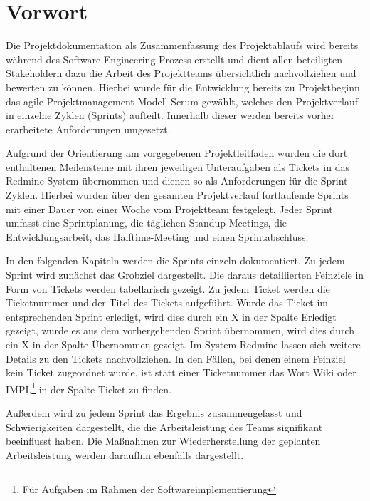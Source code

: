 \documentclass[a4paper,11pt,listof=numbered,glossary=totoc,parskip=half,toc=bib]{scrreprt}
\begin{document}
	
	\newpage
	\setcounter{tocdepth}{2}
	\tableofcontents	
	\renewcommand \thechapter{\Roman{chapter}}
	\listoftables
	\printglossaries

	


	
	\chapter{Vorwort}
	Die Projektdokumentation als Zusammenfassung des Projektablaufs wird bereits während des Software Engineering Prozess erstellt und dient allen beteiligten Stakeholdern dazu die Arbeit des Projektteams übersichtlich nachvollziehen und bewerten zu können. Hierbei wurde für die Entwicklung bereits zu Projektbeginn das agile Projektmanagement Modell Scrum gewählt, welches den Projektverlauf in einzelne Zyklen (Sprints) aufteilt. Innerhalb dieser werden bereits vorher erarbeitete Anforderungen umgesetzt. 
	
	Aufgrund der Orientierung am vorgegebenen Projektleitfaden wurden die dort enthaltenen Meilensteine mit ihren jeweiligen Unteraufgaben als Tickets in das Redmine-System übernommen und dienen so als Anforderungen für die Sprint-Zyklen. Hierbei wurden über den gesamten Projektverlauf fortlaufende Sprints mit einer Dauer von einer Woche vom Projektteam festgelegt. Jeder Sprint umfasst eine Sprintplanung, die täglichen Standup-Meetings, die Entwicklungsarbeit, das Halftime-Meeting und einen Sprintabschluss.

In den folgenden Kapiteln werden die Sprints einzeln dokumentiert. Zu jedem Sprint wird zunächst das Grobziel dargestellt. Die daraus detaillierten Feinziele in Form von Tickets werden tabellarisch gezeigt. Zu jedem Ticket werden die Ticketnummer und der Titel des Tickets aufgeführt. Wurde das Ticket im entsprechenden Sprint erledigt, wird dies durch ein X in der Spalte Erledigt gezeigt, wurde es aus dem vorhergehenden Sprint übernommen, wird dies durch ein X in der Spalte Übernommen gezeigt. Im System Redmine lassen sich weitere Details zu den Tickets nachvollziehen. In den Fällen, bei denen einem Feinziel kein Ticket zugeordnet wurde, ist statt einer Ticketnummer das Wort Wiki oder IMPL\footnote{Für Aufgaben im Rahmen der Softwareimplementierung} in der Spalte Ticket zu finden.

Außerdem wird zu jedem Sprint das Ergebnis zusammengefasst und Schwierigkeiten dargestellt, die die Arbeitsleistung des Teams signifikant beeinflusst haben. Die Maßnahmen zur Wiederherstellung der geplanten Arbeitsleistung werden daraufhin ebenfalls dargestellt.
\end{document}
